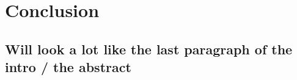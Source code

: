 \documentclass[journal=jpcbfk,manuscript=article]{achemso}
\begin{document}
\section{\label{sec:conc}Conclusion}
\subsection{\label{sec:Results}Will look a lot like the last paragraph of the intro / the abstract}

\end{document}
